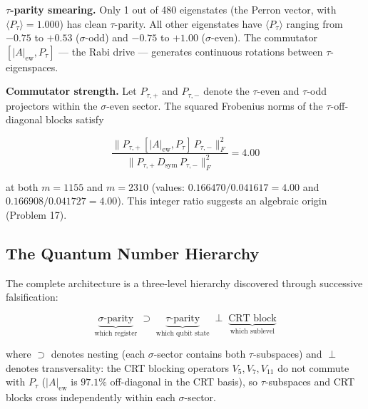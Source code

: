 \documentclass[11pt,letterpaper]{article}
\theoremstyle{definition}
\theoremstyle{remark}
\begin{document}
\textbf{$\tau$-parity smearing.} Only 1 out of 480 eigenstates (the Perron vector, with $\langle P_\tau \rangle = 1.000$) has clean $\tau$-parity. All other eigenstates have $\langle P_\tau \rangle$ ranging from $-0.75$ to $+0.53$ ($\sigma$-odd) and $-0.75$ to $+1.00$ ($\sigma$-even). The commutator $[|A|_{\text{ew}}, P_\tau]$ --- the Rabi drive --- generates continuous rotations between $\tau$-eigenspaces.

\textbf{Commutator strength.} Let $P_{\tau,+}$ and $P_{\tau,-}$ denote the $\tau$-even and $\tau$-odd projectors within the $\sigma$-even sector. The squared Frobenius norms of the $\tau$-off-diagonal blocks satisfy

\[\frac{\|P_{\tau,+}\, [\lvert A\rvert_{\text{ew}}, P_\tau]\, P_{\tau,-}\|_F^2}{\|P_{\tau,+}\, D_{\text{sym}}\, P_{\tau,-}\|_F^2} = 4.00\]

at both $m = 1155$ and $m = 2310$ (values: $0.166470 / 0.041617 = 4.00$ and $0.166908 / 0.041727 = 4.00$). This integer ratio suggests an algebraic origin (Problem 17).

\subsection{The Quantum Number Hierarchy}\label{the-quantum-number-hierarchy}

The complete architecture is a three-level hierarchy discovered through successive falsification:

\[\underbrace{\sigma\text{-parity}}_{\text{which register}} \;\supset\; \underbrace{\tau\text{-parity}}_{\text{which qubit state}} \;\perp\; \underbrace{\text{CRT block}}_{\text{which sublevel}}\]

where $\supset$ denotes nesting (each $\sigma$-sector contains both $\tau$-subspaces) and $\perp$ denotes transversality: the CRT blocking operators $V_5, V_7, V_{11}$ do not commute with $P_\tau$ ($|A|_{\text{ew}}$ is $97.1\%$ off-diagonal in the CRT basis), so $\tau$-subspaces and CRT blocks cross independently within each $\sigma$-sector.
\end{document}
